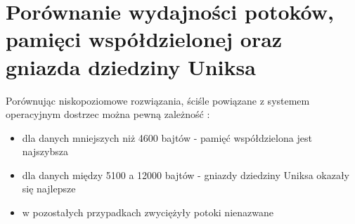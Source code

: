 \section{Porównanie wydajności potoków, pamięci współdzielonej oraz gniazda dziedziny Uniksa}

Porównując niskopoziomowe rozwiązania, ściśle powiązane z systemem operacyjnym dostrzec można pewną zależność \cite{ZX2011}:

\begin{itemize}
    \item dla danych mniejszych niż 4600 bajtów - pamięć współdzielona jest najszybsza
    \item dla danych między 5100 a 12000 bajtów - gniazdy dziedziny Uniksa okazały się najlepsze
    \item w pozostałych przypadkach zwyciężyły potoki nienazwane
\end{itemize}
